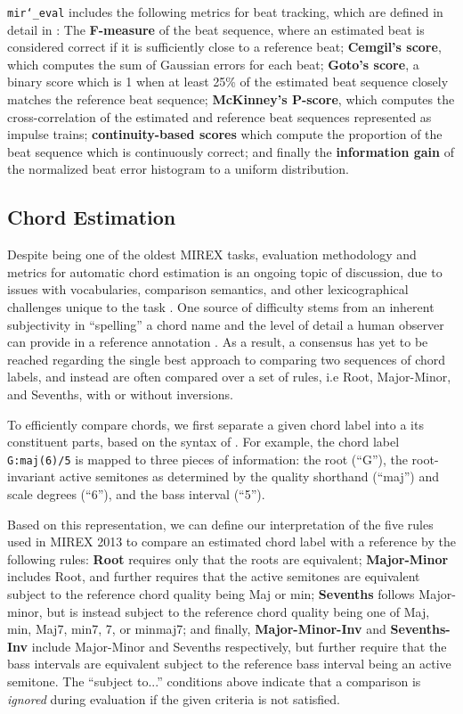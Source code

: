 \documentclass{article}
\def\mireval{\texttt{mir\char`_eval}}
\begin{document}
\mireval{} includes the following metrics for beat tracking, which are defined in detail in \cite{davies2009evaluation}:
The \textbf{F-measure} of the beat sequence, where an estimated beat is considered correct if it is sufficiently close to a reference beat;
\textbf{Cemgil's score}, which computes the sum of Gaussian errors for each beat;
\textbf{Goto's score}, a binary score which is 1 when at least 25\% of the estimated beat sequence closely matches the reference beat sequence;
\textbf{McKinney's P-score}, which computes the cross-correlation of the estimated and reference beat sequences represented as impulse trains;
\textbf{continuity-based scores} which compute the proportion of the beat sequence which is continuously correct;
and finally the \textbf{information gain} of the normalized beat error histogram to a uniform distribution.

\subsection{Chord Estimation}

Despite being one of the oldest MIREX tasks, evaluation methodology and metrics for automatic chord estimation is an ongoing topic of discussion, due to issues with vocabularies, comparison semantics, and other lexicographical challenges unique to the task \cite{pauwels2013evaluating}.
One source of difficulty stems from an inherent subjectivity in ``spelling'' a chord name and the level of detail a human observer can provide in a reference annotation \cite{ni2013understanding}.
As a result, a consensus has yet to be reached regarding the single best approach to comparing two sequences of chord labels, and instead are often compared over a set of rules, i.e Root, Major-Minor, and Sevenths, with or without inversions.

To efficiently compare chords, we first separate a given chord label into a its constituent parts, based on the syntax of \cite{harte2010towards}.
For example, the chord label \texttt{G:maj(6)/5} is mapped to three pieces of information: the root (``G''), the root-invariant active semitones as determined by the quality shorthand (``maj'') and scale degrees (``6''), and the bass interval (``5'').

Based on this representation, we can define our interpretation of the five rules used in MIREX 2013\cite{choi2013mirex} to compare an estimated chord label with a reference by the following rules:
\textbf{Root} requires only that the roots are equivalent;
\textbf{Major-Minor} includes Root, and further requires that the active semitones are equivalent subject to the reference chord quality being Maj or min;
\textbf{Sevenths} follows Major-minor, but is instead subject to the reference chord quality being one of Maj, min, Maj7, min7, 7, or minmaj7;
and finally, \textbf{Major-Minor-Inv} and \textbf{Sevenths-Inv} include Major-Minor and Sevenths respectively, but further require that the bass intervals are equivalent subject to the reference bass interval being an active semitone.
The ``subject to...'' conditions above indicate that a comparison is \emph{ignored} during evaluation if the given criteria is not satisfied.
\end{document}
